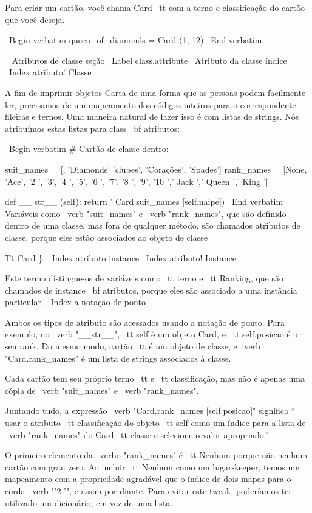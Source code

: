 \documentclass[10pt]{book}
\begin{document}
\begin {itemize}
{{{{{{{{{{{{{{{Para criar um cartão, você chama {Card \ tt} com a
terno e classificação do cartão que você deseja.

\ Begin {verbatim}
queen_of_diamonds = Card (1, 12)
\ End {verbatim}
%


\ {} Atributos de classe seção
\ Label {} class.attribute
\ {Atributo da classe} índice
\ Index {atributo! Classe}

A fim de imprimir objetos Carta de uma forma que as pessoas podem facilmente
ler, precisamos de um mapeamento dos códigos inteiros para o correspondente
fileiras e ternos. Uma maneira natural de
fazer isso é com listas de strings. Nós atribuímos estas listas para {class \ bf
atributos}:

\ Begin {verbatim}
# Cartão de classe dentro:

    suit_names = [, 'Diamonds' 'clubes', 'Corações', 'Spades']
    rank_names = [None, 'Ace', '2 ', '3', '4 ', '5', '6 ', '7', 
              '8 ', '9', '10 ',' Jack ',' Queen ',' King ']

    def __ str__ (self):
        return '%
                             Card.suit_names [self.naipe])
\ End {verbatim}
%
Variáveis ​​como \ verb "suit_names" e \ verb "rank_names", que são
definido dentro de uma classe, mas fora de qualquer método, são chamados
atributos de classe, porque eles estão associados ao objeto de classe 
{Tt Card \}.
\ Index {atributo instance}
\ Index {atributo! Instance}

Este termo distingue-os de variáveis ​​como {\ tt terno} e {\ tt
  Ranking}, que são chamados de {instance \ bf atributos}, porque eles são
associado a uma instância particular.
\ Index {} a notação de ponto

Ambos os tipos de atributo são acessados ​​usando a notação de ponto. Para
exemplo, no \ verb "__str__", {\ tt self} é um objeto Card,
e {\ tt self.posicao} é o seu rank. Do mesmo modo, {cartão \ tt}
é um objeto de classe, e \ verb "Card.rank_names" é um
lista de strings associados à classe.

Cada cartão tem seu próprio terno {\ tt} e {\ tt classificação}, mas não
é apenas uma cópia de \ verb "suit_names" e \ verb "rank_names".

Juntando tudo, a expressão
\ verb "Card.rank_names [self.posicao]" significa `` usar o atributo {\ tt classificação}
do objeto {\ tt self} como um índice para a lista de \ verb "rank_names"
do {Card \ tt} classe e selecione o valor apropriado.''

O primeiro elemento da \ verbo "rank_names" é {\ tt Nenhum} porque não
nenhum cartão com grau zero. Ao incluir {\ tt Nenhum} como um lugar-keeper,
temos um mapeamento com a propriedade agradável que o índice de dois mapas para o
corda \ verb "'2 '", e assim por diante. Para evitar este tweak, poderíamos ter
utilizado um dicionário, em vez de uma lista.

}}}}}}}}}}}}}}}}
\end{itemize}
\end{document}
